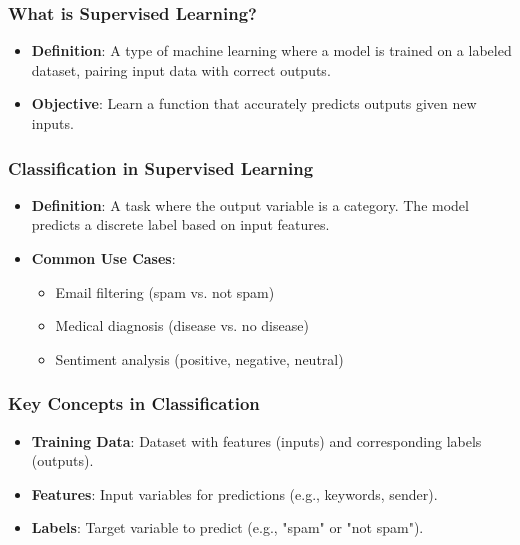 \documentclass[aspectratio=169]{beamer}
\begin{document}
\frame{\titlepage}

\begin{frame}[fragile]
    \titlepage
\end{frame}

\begin{frame}[fragile]
    \frametitle{What is Supervised Learning?}
    \begin{itemize}
        \item \textbf{Definition}: A type of machine learning where a model is trained on a labeled dataset, pairing input data with correct outputs.
        \item \textbf{Objective}: Learn a function that accurately predicts outputs given new inputs.
    \end{itemize}
\end{frame}

\begin{frame}[fragile]
    \frametitle{Classification in Supervised Learning}
    \begin{itemize}
        \item \textbf{Definition}: A task where the output variable is a category. The model predicts a discrete label based on input features.
        \item \textbf{Common Use Cases}:
            \begin{itemize}
                \item Email filtering (spam vs. not spam)
                \item Medical diagnosis (disease vs. no disease)
                \item Sentiment analysis (positive, negative, neutral)
            \end{itemize}
    \end{itemize}
\end{frame}

\begin{frame}[fragile]
    \frametitle{Key Concepts in Classification}
    \begin{itemize}
        \item \textbf{Training Data}: Dataset with features (inputs) and corresponding labels (outputs).
        \item \textbf{Features}: Input variables for predictions (e.g., keywords, sender).
        \item \textbf{Labels}: Target variable to predict (e.g., "spam" or "not spam").
    \end{itemize}
\end{frame}
\end{document}
